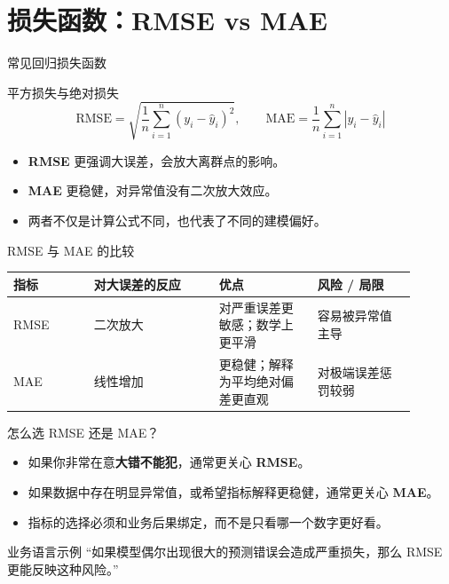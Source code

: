 \documentclass[aspectratio=169,professionalfonts]{beamer}
\newcommand{\RMSE}{\mathrm{RMSE}}
\newcommand{\MAE}{\mathrm{MAE}}
\begin{document}
\section{损失函数：RMSE vs MAE}

\begin{frame}{常见回归损失函数}
    \begin{block}{平方损失与绝对损失}
        \[
            \RMSE = \sqrt{\frac{1}{n}\sum_{i=1}^{n}(y_i - \hat y_i)^2}, \qquad
            \MAE = \frac{1}{n}\sum_{i=1}^{n}|y_i - \hat y_i|
        \]
    \end{block}

    \begin{itemize}
        \item \textbf{RMSE} 更强调大误差，会放大离群点的影响。
        \item \textbf{MAE} 更稳健，对异常值没有二次放大效应。
        \item 两者不仅是计算公式不同，也代表了不同的建模偏好。
    \end{itemize}
\end{frame}

\begin{frame}{RMSE 与 MAE 的比较}
    \small
    \begin{table}
        \centering
        \begin{tabular}{>{\raggedright\arraybackslash}p{0.18\linewidth} >{\raggedright\arraybackslash}p{0.28\linewidth} >{\raggedright\arraybackslash}p{0.22\linewidth} >{\raggedright\arraybackslash}p{0.22\linewidth}}
            \toprule
            指标 & 对大误差的反应 & 优点 & 风险 / 局限 \\
            \midrule
            RMSE & 二次放大 & 对严重误差更敏感；数学上更平滑 & 容易被异常值主导 \\
            MAE & 线性增加 & 更稳健；解释为平均绝对偏差更直观 & 对极端误差惩罚较弱 \\
            \bottomrule
        \end{tabular}
    \end{table}
\end{frame}

\begin{frame}{怎么选 RMSE 还是 MAE？}
    \begin{itemize}
        \item 如果你非常在意\textbf{大错不能犯}，通常更关心 \textbf{RMSE}。
        \item 如果数据中存在明显异常值，或希望指标解释更稳健，通常更关心 \textbf{MAE}。
        \item 指标的选择必须和业务后果绑定，而不是只看哪一个数字更好看。
    \end{itemize}

    \begin{exampleblock}{业务语言示例}
        “如果模型偶尔出现很大的预测错误会造成严重损失，那么 RMSE 更能反映这种风险。”
    \end{exampleblock}
\end{frame}
\end{document}
